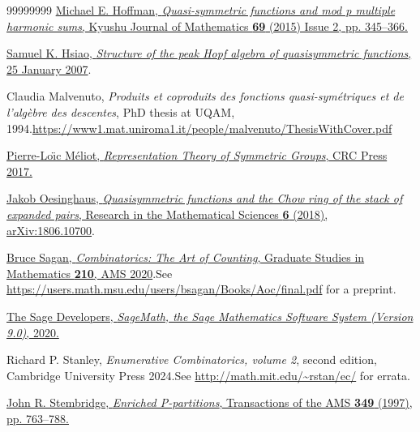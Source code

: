 \documentclass[numbers=enddot,12pt,final,onecolumn,notitlepage]{scrartcl}%
\theoremstyle{definition}
\begin{document}
\begin{thebibliography}{99999999}
%
\href{https://www.jstage.jst.go.jp/article/kyushujm/69/2/69_345/_article}{Michael
E. Hoffman, \textit{Quasi-symmetric functions and mod p multiple harmonic
sums}, Kyushu Journal of Mathematics \textbf{69} (2015) Issue 2, pp.
345--366.}

%
\href{https://www.researchgate.net/profile/Sam_Hsiao/publication/239667744_STRUCTURE_OF_THE_PEAK_HOPF_ALGEBRA_OF_QUASISYMMETRIC_FUNCTIONS/links/56b9629d08ae7e3a0f9f2d30/STRUCTURE-OF-THE-PEAK-HOPF-ALGEBRA-OF-QUASISYMMETRIC-FUNCTIONS.pdf}{Samuel
K. Hsiao, \textit{Structure of the peak Hopf algebra of quasisymmetric
functions}, 25 January 2007}.

Claudia Malvenuto, \textit{Produits et coproduits
des fonctions quasi-sym\'{e}triques et de l'alg\`{e}bre des descentes}, PhD
thesis at UQAM, 1994.\newline\url{https://www1.mat.uniroma1.it/people/malvenuto/ThesisWithCover.pdf}

%
\href{https://doi.org/10.1201/9781315371016}{Pierre-Lo\"{\i}c M\'{e}liot,
\textit{Representation Theory of Symmetric Groups}, CRC Press 2017.}

\href{https://arxiv.org/abs/1806.10700}{Jakob
Oesinghaus, \textit{Quasisymmetric functions and the Chow ring of the stack of
expanded pairs}, Research in the Mathematical Sciences \textbf{6} (2018),
arXiv:1806.10700}.

\href{https://bookstore.ams.org/gsm-210/}{Bruce
Sagan, \textit{Combinatorics: The Art of Counting}, Graduate Studies in
Mathematics \textbf{210}, AMS 2020}.\newline See
\url{https://users.math.msu.edu/users/bsagan/Books/Aoc/final.pdf} for a preprint.

\href{http://www.sagemath.org}{The Sage
Developers, \textit{SageMath, the Sage Mathematics Software System (Version
9.0)}, 2020.}

Richard P. Stanley, \textit{Enumerative
Combinatorics, volume 2}, second edition, Cambridge University Press
2024.\newline See \url{http://math.mit.edu/~rstan/ec/} for errata.

%
\href{https://www.ams.org/journals/tran/1997-349-02/S0002-9947-97-01804-7/}{John
R. Stembridge, \textit{Enriched P-partitions}, Transactions of the AMS
\textbf{349} (1997), pp. 763--788.}
\end{thebibliography}
\end{document}
